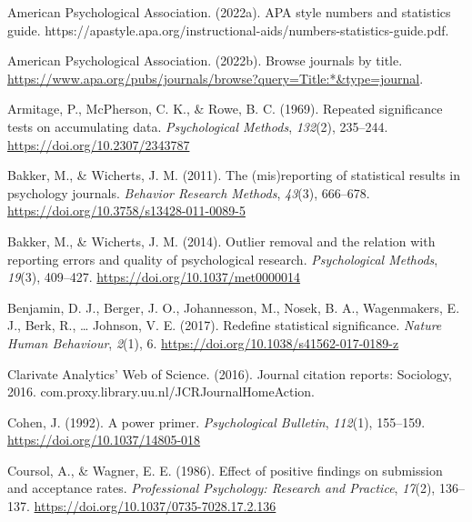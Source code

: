 \documentclass[
  12pt,
]{article}
\begin{document}
\begingroup

\noindent \vspace{-2em} \setlength{\parindent}{-0.4in}
\setlength{\leftskip}{0.4in} \setlength{\parskip}{7pt}

\hypertarget{refs}{}
\leavevmode\hypertarget{ref-APA_numb_stat_guide}{}%
American Psychological Association. (2022a). APA style numbers and
statistics guide.
https://apastyle.apa.org/instructional-aids/numbers-statistics-guide.pdf.

\leavevmode\hypertarget{ref-APA_list_journals}{}%
American Psychological Association. (2022b). Browse journals by title.
\url{https://www.apa.org/pubs/journals/browse?query=Title:*\&type=journal}.

\leavevmode\hypertarget{ref-Armitage}{}%
Armitage, P., McPherson, C. K., \& Rowe, B. C. (1969). Repeated
significance tests on accumulating data. \emph{Psychological Methods},
\emph{132}(2), 235--244. \url{https://doi.org/10.2307/2343787}

\leavevmode\hypertarget{ref-Bakker2011}{}%
Bakker, M., \& Wicherts, J. M. (2011). The (mis)reporting of statistical
results in psychology journals. \emph{Behavior Research Methods},
\emph{43}(3), 666--678. \url{https://doi.org/10.3758/s13428-011-0089-5}

\leavevmode\hypertarget{ref-Bakker2014}{}%
Bakker, M., \& Wicherts, J. M. (2014). Outlier removal and the relation
with reporting errors and quality of psychological research.
\emph{Psychological Methods}, \emph{19}(3), 409--427.
\url{https://doi.org/10.1037/met0000014}

\leavevmode\hypertarget{ref-Benjamin}{}%
Benjamin, D. J., Berger, J. O., Johannesson, M., Nosek, B. A.,
Wagenmakers, E. J., Berk, R., \ldots{} Johnson, V. E. (2017). Redefine
statistical significance. \emph{Nature Human Behaviour}, \emph{2}(1), 6.
\url{https://doi.org/10.1038/s41562-017-0189-z}

\leavevmode\hypertarget{ref-WOS}{}%
Clarivate Analytics' Web of Science. (2016). Journal citation reports:
Sociology, 2016. com.proxy.library.uu.nl/JCRJournalHomeAction.

\leavevmode\hypertarget{ref-Cohen}{}%
Cohen, J. (1992). A power primer. \emph{Psychological Bulletin},
\emph{112}(1), 155--159. \url{https://doi.org/10.1037/14805-018}

\leavevmode\hypertarget{ref-Coursol}{}%
Coursol, A., \& Wagner, E. E. (1986). Effect of positive findings on
submission and acceptance rates. \emph{Professional Psychology: Research
and Practice}, \emph{17}(2), 136--137.
\url{https://doi.org/10.1037/0735-7028.17.2.136}
\end{document}
